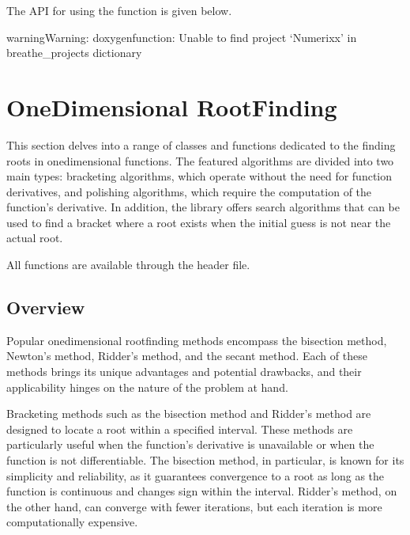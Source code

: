 \documentclass[letterpaper,10pt,english]{sphinxmanual}
\begin{document}
\sphinxAtStartPar
The API for using the  function is given below.

\begin{sphinxadmonition}{warning}{Warning:}
\sphinxAtStartPar
doxygenfunction: Unable to find project ‘Numerixx’ in breathe\_projects dictionary
\end{sphinxadmonition}

\sphinxstepscope


\chapter{One\sphinxhyphen{}Dimensional Root\sphinxhyphen{}Finding}
\label{\detokenize{docRoots:one-dimensional-root-finding}}\label{\detokenize{docRoots::doc}}
\sphinxAtStartPar
This section delves into a range of classes and functions dedicated to the finding roots in one\sphinxhyphen{}dimensional functions. The featured algorithms are divided into two main types: bracketing algorithms, which operate without the need for function derivatives, and polishing algorithms, which require the computation of the function’s derivative. In addition, the library offers search algorithms that can be used to find a bracket where a root exists when the initial guess is not near the actual root.

\sphinxAtStartPar
All functions are available through the  header file.


\section{Overview}
\label{\detokenize{docRoots:overview}}
\sphinxAtStartPar
Popular one\sphinxhyphen{}dimensional root\sphinxhyphen{}finding methods encompass the bisection method, Newton’s method, Ridder’s method, and the secant method. Each of these methods brings its unique advantages and potential drawbacks, and their applicability hinges on the nature of the problem at hand.

\sphinxAtStartPar
Bracketing methods such as the bisection method and Ridder’s method are designed to locate a root within a specified interval. These methods are particularly useful when the function’s derivative is unavailable or when the function is not differentiable. The bisection method, in particular, is known for its simplicity and reliability, as it guarantees convergence to a root as long as the function is continuous and changes sign within the interval. Ridder’s method, on the other hand, can converge with fewer iterations, but each iteration is more computationally expensive.
\end{document}
